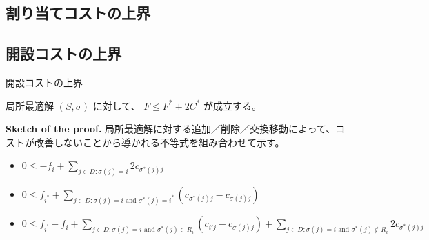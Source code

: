 \documentclass[aspectratio=169]{beamer}
\newcommand*{\localopt}{(S, \sigma)}
\begin{document}
\subsection{割り当てコストの上界}

\subsection{開設コストの上界}

\begin{frame}{開設コストの上界}
  \begin{lemma}
    局所最適解 \(\localopt\) に対して、
    \(F \le F^* + 2C^*\)
    が成立する。
  \end{lemma}

  \textbf{Sketch of the proof. }
  局所最適解に対する追加／削除／交換移動によって、コストが改善しないことから導かれる不等式を組み合わせて示す。
  \begin{itemize}
    \leftskip 2em
    \item[（削除） ] \(0 \le -f_i + \sum_{j \in D \colon \sigma(j) = i} 2c_{\sigma^*(j)j}\)
    \item[（追加） ] \(0 \le f_{i^*} + \sum_{j \in D \colon \sigma(j) = i \text{ and } \sigma^*(j) = i^*} (c_{\sigma^*(j)j} - c_{\sigma(j)j})\)
    \item[（交換） ] \(0 \le f_{i^{'}} - f_i + \sum_{j \in D \colon \sigma(j) = i \text{ and } \sigma^*(j) \in R_i} (c_{i'j} - c_{\sigma(j)j}) + \sum_{j \in D \colon \sigma(j) = i \text{ and } \sigma^*(j) \notin R_i} 2c_{\sigma^*(j)j}\)
  \end{itemize}
\end{frame}
\end{document}
